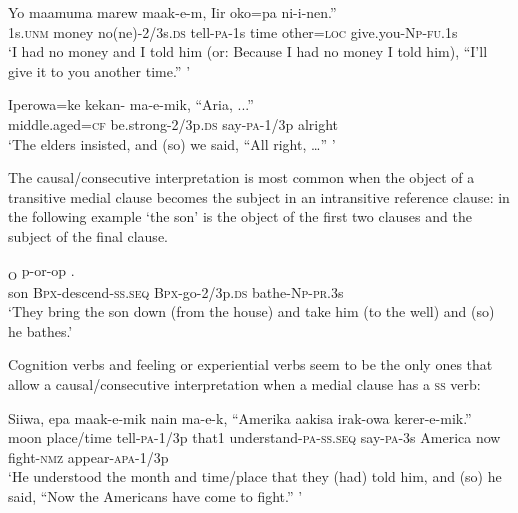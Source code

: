 \ea%
\label{ex:8:x1434}
\gll Yo  maamuma  marew maak-e-m, {\textquotedbl}Iir  oko=pa  ni-i-nen.''\\
1s.\textsc{unm} money no(ne)-2/3s.\textsc{ds} tell-\textsc{pa}-1s time  other=\textsc{loc} give.you-\textsc{Np}-\textsc{fu}.1s\\
\glt`I had no money and I told him (or: Because I had no money I told him), ``I'll give it to you another time.'' '
\z


\ea%
\label{ex:8:x1412}
\gll Iperowa=ke  kekan-  ma-e-mik,  ``Aria,  ...'' \\
middle.aged=\textsc{cf} be.strong-2/3p.\textsc{ds} say-\textsc{pa}-1/3p alright\\
\glt`The elders insisted, and (so) we said, ``All right, {\dots}'' '
\z


The causal/consecutive interpretation is most common when the object of a transitive medial clause becomes the subject in an intransitive reference clause: in the following example `the son' is the object of the first two clauses and the subject of the final clause.

\ea%
\label{ex:8:x1504}
\textsubscript{O}  p-or-op   . \\
son \textsc{Bpx}-descend-\textsc{ss}.\textsc{seq} \textsc{Bpx}-go-2/3p.\textsc{ds} bathe-\textsc{Np}-\textsc{pr}.3s\\
\glt`They bring the son down (from the house) and take him (to the well) and (so) he bathes.'
\z


Cognition verbs and feeling or experiential verbs seem to be the only ones that allow a causal/consecutive interpretation when a medial clause has a \textsc{ss} verb:

\ea%
\label{ex:8:x1440}
\gll Siiwa,  epa  maak-e-mik  nain    ma-e-k, ``Amerika  aakisa  irak-owa  kerer-e-mik.''\\
moon  place/time  tell-\textsc{pa}-1/3p that1  understand-\textsc{pa}-\textsc{ss}.\textsc{seq} say-\textsc{pa}-3s America now fight-\textsc{nmz} appear-\textsc{apa}-1/3p\\
\glt`He understood the month and time/place that they (had) told him, and (so) he said, ``Now the Americans have come to fight.'' '
\z
{}


